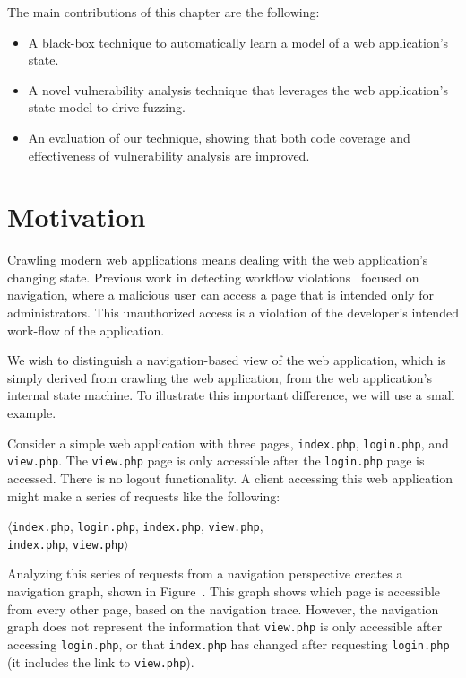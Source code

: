 \noindent{}The main contributions of this chapter are the following:
\begin{itemize}
 \item A black-box technique to automatically learn a model of a web
   application's state. 
 \item A novel vulnerability analysis technique that leverages the web
   application's state model to drive fuzzing.
 \item An evaluation of our technique, showing that both code coverage and
   effectiveness of vulnerability analysis are improved.
\end{itemize}

\section{Motivation}



Crawling modern web applications means dealing with the web application's
changing state. Previous work in detecting workflow
violations~\cite{balzarotti07:mimosa,li11:BLOCK,cova07:swaddler,felmetsger10:logic}
focused on navigation, where a malicious user can access a page that is
intended only for administrators. This unauthorized access is a violation of
the developer's intended work-flow of the application.

We wish to distinguish a navigation-based view of the web application, which is
simply derived from crawling the web application, from the web application's
internal state machine. To illustrate this important difference, we will use a small
example.

Consider a simple web application with three pages,
\texttt{index.php}, \texttt{login.php}, and \texttt{view.php}. The
\texttt{view.php} page is only accessible after the \texttt{login.php} page is
accessed. There is no logout functionality. A client accessing this web
application might make a series of requests like the following:

\noindent{}$\langle$\texttt{index.php}, \texttt{login.php}, \texttt{index.php},
\texttt{view.php}, \\
\phantom{$\langle$}\texttt{index.php}, \texttt{view.php}$\rangle$

Analyzing this series of requests from a navigation perspective creates a
navigation graph, shown in Figure~. This graph shows
which page is accessible from every other page, based on the navigation trace.
However, the navigation graph does not represent the information that
\texttt{view.php} is only accessible after accessing \texttt{login.php}, or
that \texttt{index.php} has changed after requesting \texttt{login.php} (it
includes the link to \texttt{view.php}).

